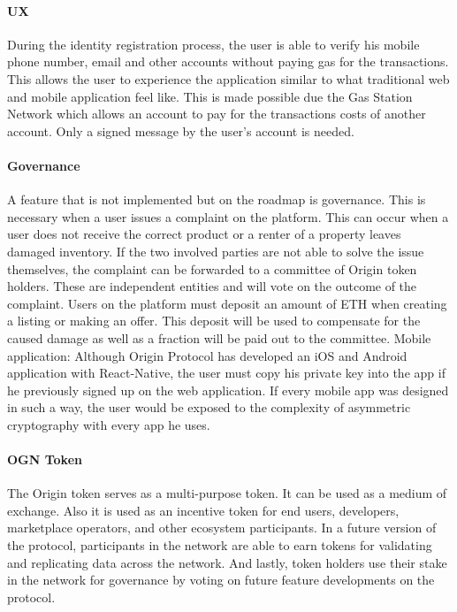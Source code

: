 \paragraph{UX}
During the identity registration process, the user is able to verify his mobile phone number, email and other accounts without paying gas for the transactions. This allows the user to experience the application similar to what traditional web and mobile application feel like. This is made possible due the Gas Station Network which allows an account to pay for the transactions costs of another account. Only a signed message by the user's account is needed. 

\paragraph{Governance}
A feature that is not implemented but on the roadmap is governance. This is necessary when a user issues a complaint on the platform. This can occur when a user does not receive the correct product or a renter of a property leaves damaged inventory. If the two involved parties are not able to solve the issue themselves, the complaint can be forwarded to a committee of Origin token holders. These are independent entities and will vote on the outcome of the complaint. Users on the platform must deposit an amount of ETH when creating a listing or making an offer. This deposit will be used to compensate for the caused damage as well as a fraction will be paid out to the committee.
Mobile application: Although Origin Protocol has developed an iOS and Android application with React-Native, the user must copy his private key into the app if he previously signed up on the web application. If every mobile app was designed in such a way, the user would be exposed to the complexity of asymmetric cryptography with every app he uses. 

\paragraph{OGN Token} The Origin token serves as a multi-purpose token. It can be used as a medium of exchange. Also it is used as an incentive token for end users, developers, marketplace operators, and other ecosystem participants. In a future version of the protocol, participants in the network are able to earn tokens for validating and replicating data across the network. And lastly, token holders use their stake in the network for governance by voting on future feature developments on the protocol. 

